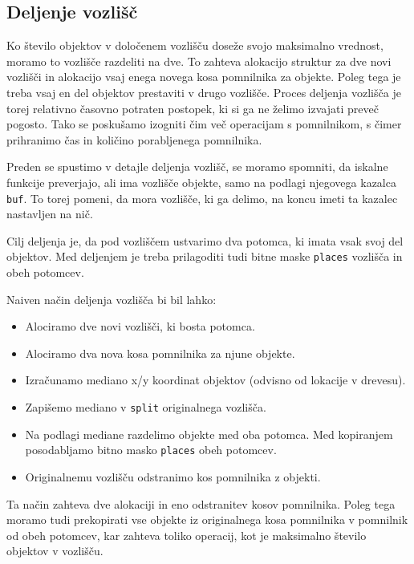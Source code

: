 \documentclass[a4paper,12pt]{article}
\begin{document}
\subsection{Deljenje vozlišč}
Ko število objektov v določenem vozlišču doseže svojo maksimalno vrednost, moramo to vozlišče
razdeliti na dve. To zahteva alokacijo struktur za dve novi vozlišči in alokacijo vsaj enega novega
kosa pomnilnika za objekte. Poleg tega je treba vsaj en del objektov prestaviti v drugo vozlišče.
Proces deljenja vozlišča je torej relativno časovno potraten postopek, ki si ga ne želimo izvajati
preveč pogosto. Tako se poskušamo izogniti čim več operacijam s pomnilnikom, s čimer prihranimo
čas in količino porabljenega pomnilnika.

Preden se spustimo v detajle deljenja vozlišč, se moramo spomniti, da iskalne funkcije preverjajo,
ali ima vozlišče objekte, samo na podlagi njegovega kazalca \lstinline|buf|. To torej pomeni, da mora vozlišče,
ki ga delimo, na koncu imeti ta kazalec nastavljen na nič.

Cilj deljenja je, da pod vozliščem ustvarimo dva potomca, ki imata vsak svoj del objektov. Med deljenjem
je treba prilagoditi tudi bitne maske \lstinline|places| vozlišča in obeh potomcev.

Naiven način deljenja vozlišča bi bil lahko:
\begin{itemize}
    \item Alociramo dve novi vozlišči, ki bosta potomca.
    \item Alociramo dva nova kosa pomnilnika za njune objekte.
    \item Izračunamo mediano x/y koordinat objektov (odvisno od lokacije v drevesu).
    \item Zapišemo mediano v \lstinline|split| originalnega vozlišča.
    \item Na podlagi mediane razdelimo objekte med oba potomca. Med kopiranjem
    posodabljamo bitno masko \lstinline|places| obeh potomcev.
    \item Originalnemu vozlišču odstranimo kos pomnilnika z objekti.
\end{itemize}
Ta način zahteva dve alokaciji in eno odstranitev kosov pomnilnika. Poleg tega moramo tudi prekopirati
vse objekte iz originalnega kosa pomnilnika v pomnilnik od obeh potomcev, kar zahteva toliko operacij, kot
je maksimalno število objektov v vozlišču.
\end{document}
